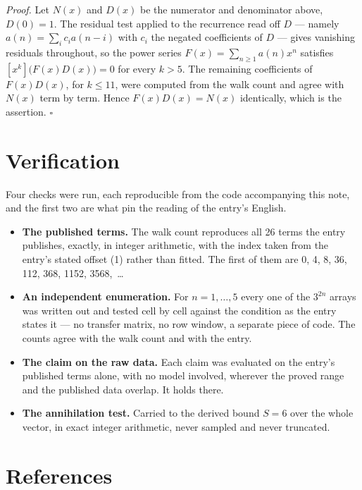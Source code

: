 \documentclass[11pt]{article}
\theoremstyle{definition}
\begin{document}
{\itshape Proof.} Let $N(x)$ and $D(x)$ be the numerator and denominator above, $D(0)=1$. The residual test applied to the recurrence read off $D$ --- namely $a(n) = \sum_i c_i a(n-i)$ with $c_i$ the negated coefficients of $D$ --- gives vanishing residuals throughout, so the power series $F(x)=\sum_{n\ge 1}a(n)x^n$ satisfies $[x^k]\bigl(F(x)D(x)\bigr) = 0$ for every $k > 5$. The remaining coefficients of $F(x)D(x)$, for $k \le 11$, were computed from the walk count and agree with $N(x)$ term by term. Hence $F(x)D(x) = N(x)$ identically, which is the assertion. $\square$

\section{Verification}

Four checks were run, each reproducible from the code accompanying this note, and the first two are what pin the reading of the entry's English.

\begin{itemize}

\item {\bfseries The published terms.} The walk count reproduces all 26 terms the entry publishes, exactly, in integer arithmetic, with the index taken from the entry's stated offset (1) rather than fitted. The first of them are 0, 4, 8, 36, 112, 368, 1152, 3568,~\dots

\item {\bfseries An independent enumeration.} For $n = 1,\dots,5$ every one of the $3^{2n}$ arrays was written out and tested cell by cell against the condition as the entry states it --- no transfer matrix, no row window, a separate piece of code. The counts agree with the walk count and with the entry.

\item {\bfseries The claim on the raw data.} Each claim was evaluated on the entry's published terms alone, with no model involved, wherever the proved range and the published data overlap. It holds there.

\item {\bfseries The annihilation test.} Carried to the derived bound $S = 6$ over the whole vector, in exact integer arithmetic, never sampled and never truncated.

\end{itemize}

\section{References}
\end{document}
